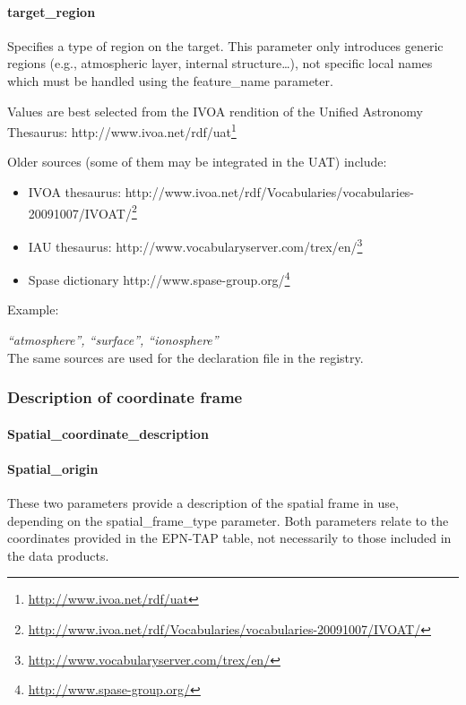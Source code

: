 \documentclass[11pt,a4paper]{ivoa}
\begin{document}
\paragraph{target\_region}

Specifies a type of region on the target. This parameter only introduces generic regions  (e.g., atmospheric layer, internal structure…), not specific local names which must be handled using the feature\_name parameter.

Values are best selected from the IVOA rendition of the Unified Astronomy Thesaurus: http://www.ivoa.net/rdf/uat\footnote{\url{http://www.ivoa.net/rdf/uat}}

Older sources (some of them may be integrated in the UAT) include:

\begin{itemize}
\item IVOA thesaurus: http://www.ivoa.net/rdf/Vocabularies/vocabularies-20091007/IVOAT/\footnote{\url{http://www.ivoa.net/rdf/Vocabularies/vocabularies-20091007/IVOAT/}}
\item IAU thesaurus: http://www.vocabularyserver.com/trex/en/\footnote{\url{http://www.vocabularyserver.com/trex/en/}}
\item Spase dictionary http://www.spase-group.org/\footnote{\url{http://www.spase-group.org/}}
\end{itemize}


Example: 

\emph{``atmosphere'', ``surface'', ``ionosphere''}\\The same sources are used for the declaration file in the registry.

\subsubsection{Description of coordinate frame}

\paragraph{Spatial\_coordinate\_description}

\paragraph{Spatial\_origin}

These two parameters provide a description of the spatial frame in use, depending on the spatial\_frame\_type parameter. Both parameters relate to the coordinates provided in the EPN-TAP table, not necessarily to those included in the data products. 
\end{document}
